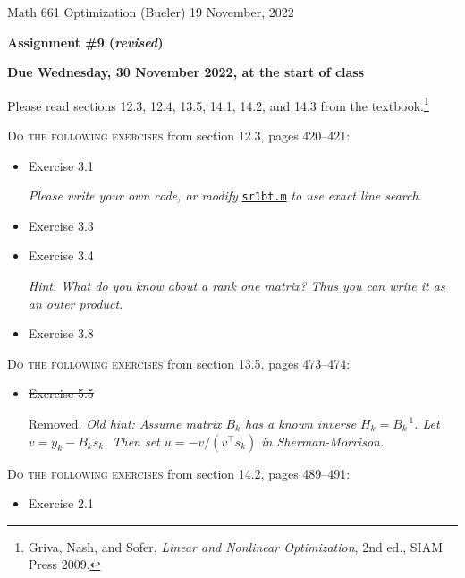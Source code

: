 \documentclass[12pt]{amsart}
\begin{document}
\scriptsize \noindent Math 661 Optimization (Bueler) \hfill 19 November, 2022
\normalsize

\medskip\bigskip

\Large\centerline{\textbf{Assignment \#9 \quad (\emph{revised})}}
\large
\bigskip

\centerline{\textbf{Due Wednesday, 30 November 2022, at the start of class}}
\bigskip
\normalsize

\thispagestyle{empty}

\bigskip
Please read sections 12.3, 12.4, 13.5, 14.1, 14.2, and 14.3 from the textbook.\footnote{Griva, Nash, and Sofer, \emph{Linear and Nonlinear Optimization}, 2nd ed., SIAM Press 2009.}

\bigskip
\noindent \textsc{Do the following exercises} from section 12.3, pages 420--421:

\begin{itemize}
\item Exercise 3.1 \quad \begin{minipage}[t]{4.5in} \emph{Please write your own code, or modify} \href{https://bueler.github.io/opt/assets/codes/sr1bt.m}{\texttt{sr1bt.m}} \emph{to use exact line search.} \end{minipage}
\item Exercise 3.3
\item Exercise 3.4 \quad \begin{minipage}[t]{4.5in} \emph{Hint.  What do you know about a rank one matrix?  Thus you can write it as an outer product.} \end{minipage}
\item Exercise 3.8
\end{itemize}


\bigskip
\noindent \textsc{Do the following exercises} from section 13.5, pages 473--474:

\begin{itemize}
\item \st{Exercise 5.5} \quad \begin{minipage}[t]{4.5in} Removed.  \emph{Old hint:  Assume matrix $B_k$ has a known inverse $H_k=B_k^{-1}$.  Let $v=y_k - B_k s_k$.  Then set $u=-v/(v^\top s_k)$ in Sherman-Morrison.} \end{minipage}
\end{itemize}


\bigskip
\noindent \textsc{Do the following exercises} from section 14.2, pages 489--491:

\begin{itemize}
\item Exercise 2.1
\end{itemize}
\end{document}
